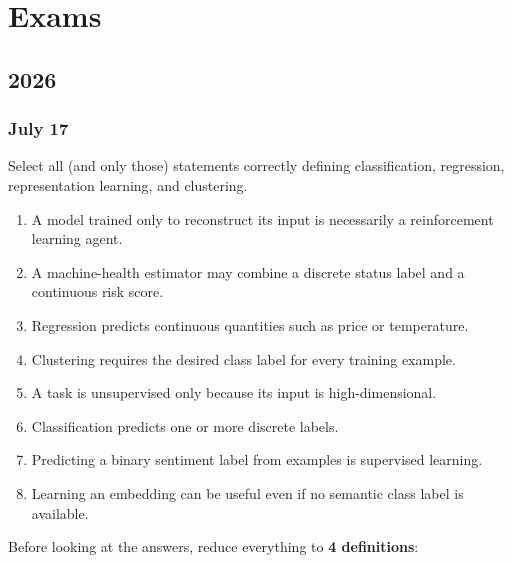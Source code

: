 \section{Exams}

\subsection{2026}

\subsubsection{July 17}

\exercise[1.5] Select all (and only those) statements correctly defining classification, regression, representation learning, and clustering.
\begin{enumerate}
    \item A model trained only to reconstruct its input is necessarily a reinforcement learning agent.
    \item A machine-health estimator may combine a discrete status label and a continuous risk score.
    \item Regression predicts continuous quantities such as price or temperature.
    \item Clustering requires the desired class label for every training example.
    \item A task is unsupervised only because its input is high-dimensional.
    \item Classification predicts one or more discrete labels.
    \item Predicting a binary sentiment label from examples is supervised learning.
    \item Learning an embedding can be useful even if no semantic class label is available.
\end{enumerate}
\solution Before looking at the answers, reduce everything to \textbf{4 definitions}:
